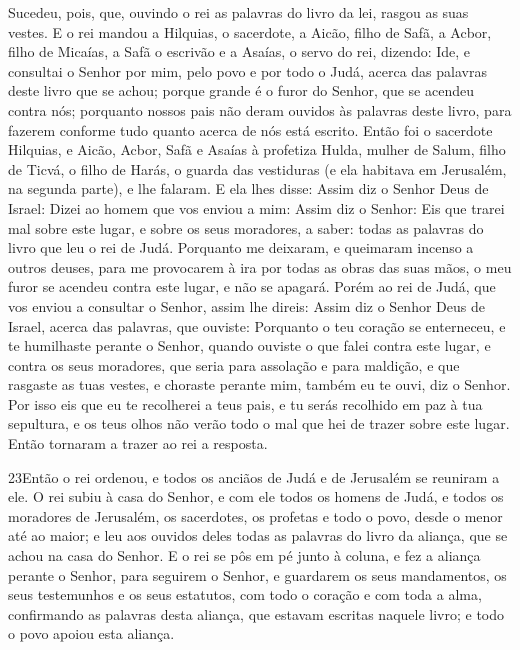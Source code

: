 Sucedeu, pois, que, ouvindo o rei as palavras do livro da lei,
rasgou as suas vestes. E o rei mandou a Hilquias, o
sacerdote, a Aicão, filho de Safã, a Acbor, filho de Micaías, a Safã
o escrivão e a Asaías, o servo do rei, dizendo: Ide, e
consultai o Senhor por mim, pelo povo e por todo o Judá, acerca das
palavras deste livro que se achou; porque grande é o furor do
Senhor, que se acendeu contra nós; porquanto nossos pais não deram
ouvidos às palavras deste livro, para fazerem conforme tudo quanto
acerca de nós está escrito. Então foi o sacerdote Hilquias, e
Aicão, Acbor, Safã e Asaías à profetiza Hulda, mulher de Salum,
filho de Ticvá, o filho de Harás, o guarda das vestiduras (e ela
habitava em Jerusalém, na segunda parte), e lhe falaram. E
ela lhes disse: Assim diz o Senhor Deus de Israel: Dizei ao homem
que vos enviou a mim: Assim diz o Senhor: Eis que trarei mal
sobre este lugar, e sobre os seus moradores, a saber: todas as
palavras do livro que leu o rei de Judá. Porquanto me
deixaram, e queimaram incenso a outros deuses, para me provocarem à
ira por todas as obras das suas mãos, o meu furor se acendeu contra
este lugar, e não se apagará. Porém ao rei de Judá, que vos
enviou a consultar o Senhor, assim lhe direis: Assim diz o Senhor
Deus de Israel, acerca das palavras, que ouviste: Porquanto o
teu coração se enterneceu, e te humilhaste perante o Senhor, quando
ouviste o que falei contra este lugar, e contra os seus moradores,
que seria para assolação e para maldição, e que rasgaste as tuas
vestes, e choraste perante mim, também eu te ouvi, diz o Senhor.
Por isso eis que eu te recolherei a teus pais, e tu serás
recolhido em paz à tua sepultura, e os teus olhos não verão todo o
mal que hei de trazer sobre este lugar. Então tornaram a trazer ao
rei a resposta.

\medskip

\lettrine{23} Então o rei ordenou, e todos os anciãos de Judá
e de Jerusalém se reuniram a ele. O rei subiu à casa do Senhor,
e com ele todos os homens de Judá, e todos os moradores de
Jerusalém, os sacerdotes, os profetas e todo o povo, desde o menor
até ao maior; e leu aos ouvidos deles todas as palavras do livro da
aliança, que se achou na casa do Senhor. E o rei se pôs em pé
junto à coluna, e fez a aliança perante o Senhor, para seguirem o
Senhor, e guardarem os seus mandamentos, os seus testemunhos e os
seus estatutos, com todo o coração e com toda a alma, confirmando as
palavras desta aliança, que estavam escritas naquele livro; e todo o
povo apoiou esta aliança.

